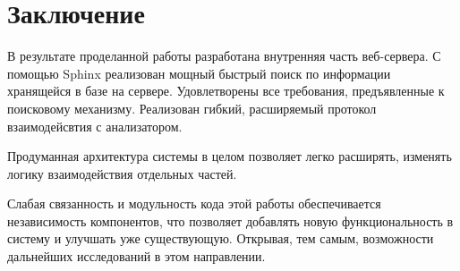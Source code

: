 \section{Заключение}
В результате проделанной работы разработана внутренняя часть веб-сервера.
С помощью Sphinx реализован мощный быстрый поиск по информации хранящейся в базе на сервере.
Удовлетворены все требования, предъявленные к поисковому механизму.
Реализован гибкий, расширяемый протокол взаимодейсвтия с анализатором.

Продуманная архитектура системы в целом позволяет легко расширять, изменять логику взаимодействия отдельных частей.

Слабая связанность и модульность кода этой работы обеспечивается независимость компонентов, что позволяет добавлять новую функциональность в систему и улучшать уже существующую.
Открывая, тем самым, возможности дальнейших исследований в этом направлении.

